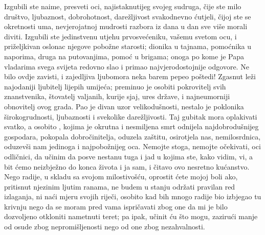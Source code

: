 \documentclass[a5paper,twoside]{article}
\begin{document}
Izgubili ste naime, presveti oci, najistaknutijeg svojeg sudruga, čije ste milo društvo, ljubaznost, dobrohotnost, darežljivost svakodnevno ćutjeli, čijoj ste se okretnosti uma, nevjerojatnoj mudrosti razbora iz dana u dan sve više morali diviti.  Izgubili ste jedinstvenu utjehu prvosvećeniku, vašemu svetom ocu, i priželjkivan oslonac njegove pobožne starosti; dionika u tajnama, pomoćnika u naporima, druga na putovanjima, pomoć u brigama; onoga po kome je Papa vladarima svega svijeta redovno slao i primao najvjerodostojnije odgovore.  Ne bilo ovdje zavisti, i zajedljiva ljubomora neka barem pepeo poštedi! Zgasnut leži najodaniji ljubitelj lijepih umijeća; preminuo je osobiti pokrovitelj svih znanstvenika, štovatelj valjanih, kurije sjaj, ures države, i najneumorniji obnovitelj ovog grada. Pao je divan uzor velikodušnosti, nestalo je poklonika širokogrudnosti, ljubaznosti i svekolike darežljivosti.  Taj gubitak mora oplakivati svatko, a osobito , kojima je okrutna i nesmiljena smrt odnijela najdobrodušnijeg gospodara, pokopala dobročinitelja, oduzela zaštitu, osirotjela nas, nemilosrdnica, oduzevši nam jedinoga i najpobožnijeg oca.  Nemojte stoga, nemojte očekivati, oci odličnici, da učinim da posve nestanu tuga i jad u kojima ste, kako vidim, vi, a bit ćemo neizbježno do konca života i ja sam, i čitavo ovo nesretno kućanstvo.  Nego radije, u skladu sa svojom milostivošću, oprostit ćete mojoj boli ako, pritisnut njezinim ljutim ranama, ne budem u stanju održati pravilan red izlaganja, ni naći mjeru svojih riječi, osobito kad bih mnogo radije bio izbjegao tu krivnju nego da se moram pred vama ispričavati zbog one da mi je bilo dozvoljeno otkloniti nametnuti teret; pa ipak, učinit ću što mogu, zazirući manje od osude zbog nepromišljenosti nego od one zbog nezahvalnosti.
\pend
\pstart
\end{document}
